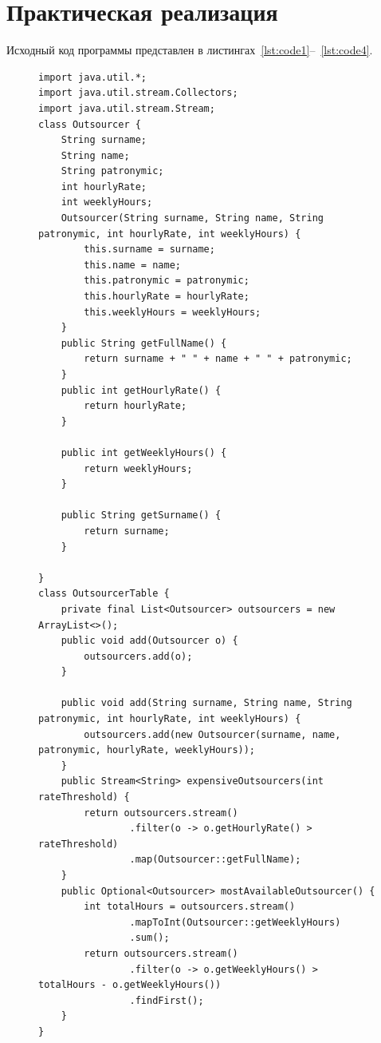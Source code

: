 \documentclass[a4paper, 14pt]{extarticle}
\begin{document}
\section {Практическая реализация}
Исходный код программы представлен в листингах~\ref{lst:code1}--~\ref{lst:code4}.
\begin{figure}[!htb]
\begin{lstlisting}[language={},caption={Основной класс для варинта 28 },label={lst:code1}]
import java.util.*;
import java.util.stream.Collectors;
import java.util.stream.Stream;
class Outsourcer {
    String surname;
    String name;
    String patronymic;
    int hourlyRate;
    int weeklyHours;
    Outsourcer(String surname, String name, String patronymic, int hourlyRate, int weeklyHours) {
        this.surname = surname;
        this.name = name;
        this.patronymic = patronymic;
        this.hourlyRate = hourlyRate;
        this.weeklyHours = weeklyHours;
    }
    public String getFullName() {
        return surname + " " + name + " " + patronymic;
    }
    public int getHourlyRate() {
        return hourlyRate;
    }

    public int getWeeklyHours() {
        return weeklyHours;
    }

    public String getSurname() {
        return surname;
    }

}
class OutsourcerTable {
    private final List<Outsourcer> outsourcers = new ArrayList<>();
    public void add(Outsourcer o) {
        outsourcers.add(o);
    }

    public void add(String surname, String name, String patronymic, int hourlyRate, int weeklyHours) {
        outsourcers.add(new Outsourcer(surname, name, patronymic, hourlyRate, weeklyHours));
    }
    public Stream<String> expensiveOutsourcers(int rateThreshold) {
        return outsourcers.stream()
                .filter(o -> o.getHourlyRate() > rateThreshold)
                .map(Outsourcer::getFullName);
    }
    public Optional<Outsourcer> mostAvailableOutsourcer() {
        int totalHours = outsourcers.stream()
                .mapToInt(Outsourcer::getWeeklyHours)
                .sum();
        return outsourcers.stream()
                .filter(o -> o.getWeeklyHours() > totalHours - o.getWeeklyHours())
                .findFirst();
    }
}



\end{lstlisting}
\end{figure}
\newpage
\end{document}
